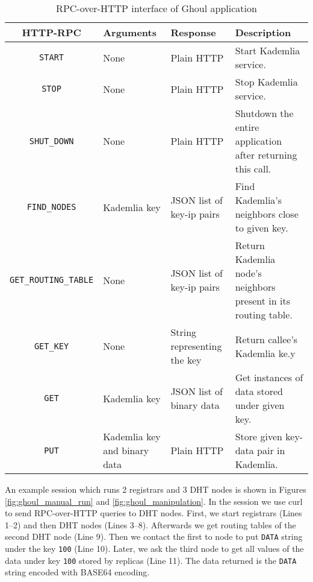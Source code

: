 \begin{table}[tbp]
  \begin{tabular}{|c|p{3cm}|p{3.6cm}|p{3.4cm}|}
    \hline
    HTTP-RPC & Arguments & Response & Description \\
    \hline
    \texttt{START} & None & Plain HTTP & Start Kademlia service.\\
    \hline
    \texttt{STOP} & None & Plain HTTP  & Stop Kademlia service.\\
    \hline
    \texttt{SHUT\_DOWN} & None & Plain HTTP &
      Shutdown the entire application after returning this call.\\
    \hline
    \texttt{FIND\_NODES} & Kademlia key & JSON list of key-ip pairs &
      Find Kademlia's neighbors close to given key.\\
    \hline
    \texttt{GET\_ROUTING\_TABLE} & None & JSON list of key-ip pairs & Return
      Kademlia node's neighbors present in its routing table.\\
    \hline
    \texttt{GET\_KEY} & None & String representing the key & Return callee's
      Kademlia ke.y\\
    \hline
    \texttt{GET} & Kademlia key  & JSON list of binary data & Get instances of
    data stored under given key. \\
    \hline
    \texttt{PUT} & Kademlia key and binary data  & Plain HTTP & Store given
    key-data pair in Kademlia. \\
    \hline
  \end{tabular}
  \caption{RPC-over-HTTP interface of Ghoul application}
  \label{tab:http_rpc}
\end{table}

An example session which runs 2 registrars and 3 DHT nodes is shown in Figures
\ref{fig:ghoul_manual_run} and \ref{fig:ghoul_manipulation}.
In the session we use curl to send RPC-over-HTTP queries to DHT nodes.
First, we start registrars (Lines 1--2) and then DHT nodes (Lines 3--8).
Afterwards we get routing tables of the second DHT node (Line 9).
Then we contact the first to node to put \texttt{DATA} string under the key
\texttt{100} (Line 10).
Later, we ask the third node to get all values of the data under key
\texttt{100} stored by replicas (Line 11).
The data returned is the \texttt{DATA} string encoded with BASE64 encoding.

